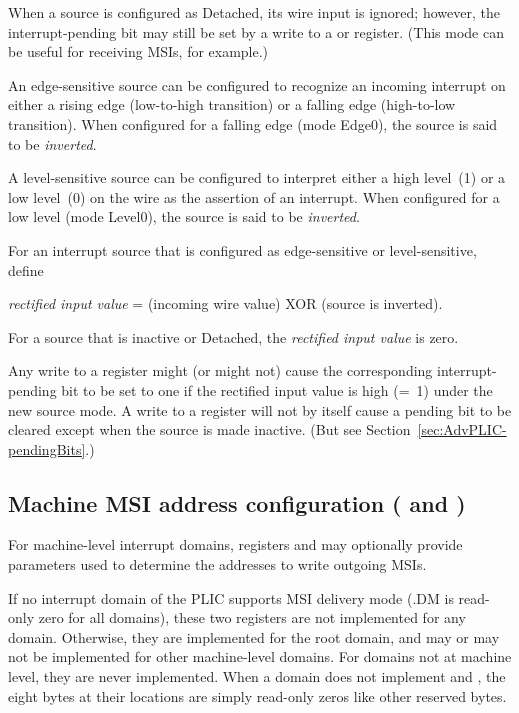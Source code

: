 When a source is configured as Detached, its wire input is ignored;
however, the interrupt-pending bit may still be set by a write to a
 or  register.
(This mode can be useful for receiving MSIs, for example.)

An edge-sensitive source can be configured to recognize an incoming
interrupt on either a rising edge (low-to-high transition) or a falling
edge (high-to-low transition).
When configured for a falling edge (mode Edge0), the source is said to
be \emph{inverted}.

A level-sensitive source can be configured to interpret either a
high level~(1) or a low level~(0) on the wire as the assertion of an
interrupt.
When configured for a low level (mode Level0), the source is said to be
\emph{inverted}.

For an interrupt source that is configured as edge-sensitive or
level-sensitive, define\nopagebreak
\begin{displayLinesTable}
\emph{rectified input value} = (incoming wire value) XOR (source is inverted).
\end{displayLinesTable}
For a source that is inactive or Detached, the
\emph{rectified input value} is zero.

Any write to a  register might (or might not) cause the
corresponding interrupt-pending bit to be set to one if the rectified
input value is high (=~1) under the new source mode.
A write to a  register will not by itself cause a pending
bit to be cleared except when the source is made inactive.
(But see Section~\ref{sec:AdvPLIC-pendingBits}.)

\subsection{%
Machine MSI address configuration
 ( and )%
}
\label{sec:AdvPLIC-reg-mmsiaddrcfg}

For machine-level interrupt domains, registers 
and  may optionally provide parameters used to
determine the addresses to write outgoing MSIs.

If no interrupt domain of the PLIC supports MSI delivery
mode (.DM is read-only zero for all domains),
these two registers are not implemented for any domain.
Otherwise, they are implemented for the root domain, and may
or may not be implemented for other machine-level domains.
For domains not at machine level, they are never implemented.
When a domain does not implement  and
, the eight bytes at their locations
are simply read-only zeros like other reserved bytes.

